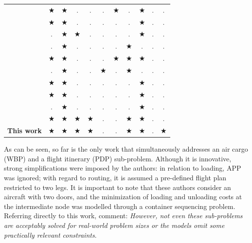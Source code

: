 \documentclass[preprint,authoryear]{elsarticle}
\begin{document}
\begin{table}[H]
\begin{tabular}{r|cc|cc|cc|ccc|c}
		\cite{RoesenerHall2014}  & $\bigstar$ & $\bigstar$  & $.$  & $.$ & $.$ & $\bigstar$   & $.$  & $\bigstar$  &  $.$&  $.$ \\
		\cite{Vancroonemburg2014}  & $\bigstar$ & $\bigstar$   & $.$ & $.$ & $.$ & $.$   & $.$  & $\bigstar$  &  $.$&  $.$ \\
		\cite{LurkinSchyns2015} & $.$ & $\bigstar$  & $\bigstar$ & $.$  & $.$ & $.$   & $.$  & $\bigstar$  &  $.$&  $.$ \\
		\cite{RoesenerBarnes2016}  & $.$ & $\bigstar$   & $.$ & $.$ & $.$ & $.$   & $\bigstar$  & $.$  &  $.$&  $.$ \\
		\cite{PaquaySchynsLimbourg2016,PaquayLimbourgSchynsOliveira2018}  & $\bigstar$ & $\bigstar$ & $.$ & $.$ & $.$ & $\bigstar$ & $\bigstar$  & $\bigstar$ & $.$&  $.$ \\
		\cite{YangLiuGao2018} & $.$ & $\bigstar$  & $.$  & $.$ & $\bigstar$  & $.$ & $\bigstar$ & $.$  & $.$&  $.$ \\
		\cite{wong2020} & $\bigstar$  & $\bigstar$  & $.$  & $.$   & $.$  & $.$ & $.$ & $\bigstar$  & $.$&  $.$  \\
		\cite{eugene2021} & $\bigstar$ & $\bigstar$ & $.$  & $.$   & $.$ & $.$ & $.$ & $\bigstar$  & $.$&  $.$  \\
		\cite{zhao2021} & $.$ & $\bigstar$ & $.$  & $.$  & $.$ & $.$ & $.$  & $\bigstar$ &  $.$&  $.$ \\
		
		\cite{MesquitaSanches2023}   & $\bigstar$ & $\bigstar$  & $\bigstar$& $\bigstar$ & $.$ & $.$ & $\bigstar$ & $\bigstar$   &  $.$&  $.$  \\
		
		{\bf This work}   & $\bigstar$ & $\bigstar$  & $\bigstar$& $\bigstar$ & $.$ & $.$ & $\bigstar$ & $\bigstar$   &  $.$&  $\bigstar$  \\
		\bottomrule 
	\end{tabular}
	\normalsize 
\end{table}

As can be seen, so far \cite{LurkinSchyns2015} is the only work that simultaneously addresses an air cargo (WBP) and a flight itinerary (PDP) sub-problem. Although it is innovative, strong simplifications were imposed by the authors: in relation to loading, APP was ignored; with regard to routing, it is assumed a pre-defined flight plan restricted to two legs. It is important to note that these authors consider an aircraft with two doors, and the minimization of loading and unloading costs at the intermediate node was modelled through a container sequencing problem. Referring directly to this work, \cite[p. 409]{BrandtStefan2019} comment: {\it However, not even these sub-problems are acceptably solved for real-world problem sizes or the models omit some practically relevant constraints}. 
\end{document}
